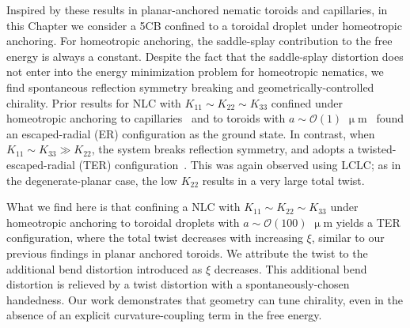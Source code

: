 Inspired by these results in planar-anchored nematic toroids and capillaries, in this Chapter we consider a 5CB confined to a toroidal droplet under homeotropic anchoring.
For homeotropic anchoring, the saddle-splay contribution to the free energy is always a constant.
Despite the fact that the saddle-splay distortion does not enter into the energy minimization problem for homeotropic nematics, we find spontaneous reflection symmetry breaking and geometrically-controlled chirality.
Prior results for NLC with $K_{11}\sim K_{22} \sim K_{33}$ confined under homeotropic anchoring to capillaries~\cite{RN179} and to toroids with $a \sim \mathcal{O}(1)$ $\upmu$m~\cite{RN274} found an escaped-radial (ER) configuration as the ground state.
In contrast, when $K_{11}\sim K_{33} \gg K_{22}$, the system breaks reflection symmetry, and adopts a twisted-escaped-radial (TER) configuration~\cite{RN192}.
This was again observed using LCLC; as in the degenerate-planar case, the low $K_{22}$ results in a very large total twist.

What we find here is that confining a NLC with $K_{11}\sim K_{22} \sim K_{33}$ under homeotropic anchoring to toroidal droplets with $a \sim \mathcal{O}(100)$ $\upmu$m yields a TER configuration, where the total twist decreases with increasing $\xi$, similar to our previous findings in planar anchored toroids.
We attribute the twist to the additional bend distortion introduced as $\xi$ decreases.
This additional bend distortion is relieved by a twist distortion with a spontaneously-chosen handedness.
Our work demonstrates that geometry can tune chirality, even in the absence of an explicit curvature-coupling term in the free energy.


